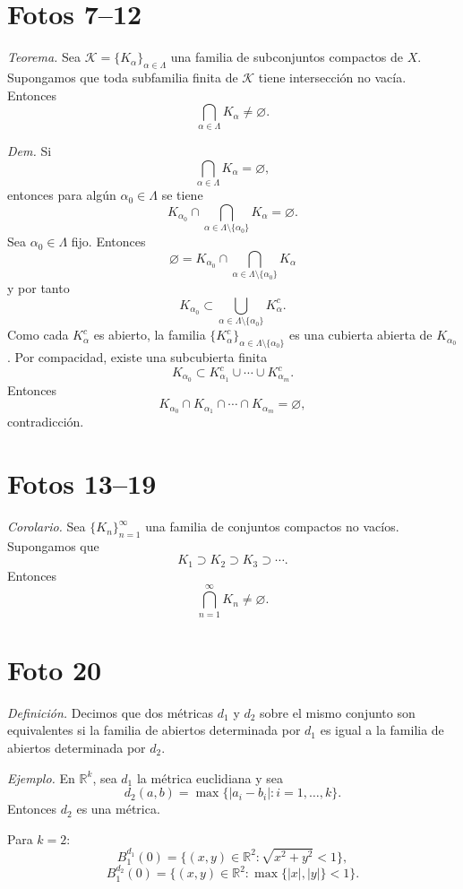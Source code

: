 \documentclass[12pt]{article}
\begin{document}
\section*{Fotos 7--12}

\textit{Teorema.} Sea $\mathcal K=\{K_\alpha\}_{\alpha\in\Lambda}$ una familia de subconjuntos compactos de $X$.
Supongamos que toda subfamilia finita de $\mathcal K$ tiene intersección no vacía.
Entonces
\[
\bigcap_{\alpha\in\Lambda}K_\alpha\neq\varnothing.
\]

\textit{Dem.} Si
\[
\bigcap_{\alpha\in\Lambda}K_\alpha=\varnothing,
\]
entonces para algún $\alpha_0\in\Lambda$ se tiene
\[
K_{\alpha_0}\cap\bigcap_{\alpha\in\Lambda\setminus\{\alpha_0\}}K_\alpha=\varnothing.
\]
Sea $\alpha_0\in\Lambda$ fijo. Entonces
\[
\varnothing=K_{\alpha_0}\cap\bigcap_{\alpha\in\Lambda\setminus\{\alpha_0\}}K_\alpha
\]
y por tanto
\[
K_{\alpha_0}\subset\bigcup_{\alpha\in\Lambda\setminus\{\alpha_0\}}K_\alpha^c.
\]
Como cada $K_\alpha^c$ es abierto, la familia $\{K_\alpha^c\}_{\alpha\in\Lambda\setminus\{\alpha_0\}}$ es una cubierta abierta de $K_{\alpha_0}$.
Por compacidad, existe una subcubierta finita
\[
K_{\alpha_0}\subset K_{\alpha_1}^c\cup\cdots\cup K_{\alpha_m}^c.
\]
Entonces
\[
K_{\alpha_0}\cap K_{\alpha_1}\cap\cdots\cap K_{\alpha_m}=\varnothing,
\]
contradicción.

\section*{Fotos 13--19}

\textit{Corolario.} Sea $\{K_n\}_{n=1}^\infty$ una familia de conjuntos compactos no vacíos.
Supongamos que
\[
K_1\supset K_2\supset K_3\supset\cdots.
\]
Entonces
\[
\bigcap_{n=1}^\infty K_n\neq\varnothing.
\]

\section*{Foto 20}

\textit{Definición.} Decimos que dos métricas $d_1$ y $d_2$ sobre el mismo conjunto son equivalentes si la familia de abiertos determinada por $d_1$ es igual a la familia de abiertos determinada por $d_2$.

\textit{Ejemplo.} En $\mathbb R^k$, sea $d_1$ la métrica euclidiana y sea
\[
d_2(a,b)=\max\{|a_i-b_i|:i=1,\dots,k\}.
\]
Entonces $d_2$ es una métrica.

Para $k=2$:
\[
B_1^{d_1}(0)=\{(x,y)\in\mathbb R^2:\sqrt{x^2+y^2}<1\},
\]
\[
B_1^{d_2}(0)=\{(x,y)\in\mathbb R^2:\max\{|x|,|y|\}<1\}.
\]
\end{document}
